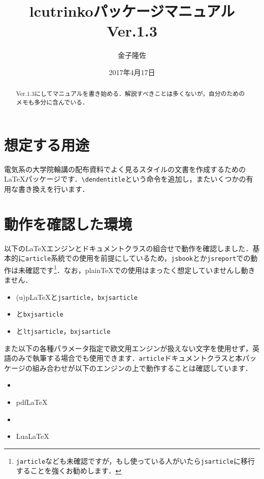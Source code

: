 \documentclass[uplatex,a4paper]{jsarticle}
\begin{document}
\title{lcutrinkoパッケージマニュアル Ver.1.3}
\date{2017年4月17日}
\author{金子隆佐}

\maketitle

\begin{abstract}
  Ver.1.3にしてマニュアルを書き始める．解説すべきことは多くないが，自分のためのメモも多分に含んでいる．
\end{abstract}

\section{想定する用途}

電気系の大学院輪講の配布資料でよく見るスタイルの文書を作成するための{\LaTeX}パッケージです．\verb|\dendentitle|という命令を追加し，またいくつかの有用な書き換えを行います．

\section{動作を確認した環境}

以下の{\LaTeX}エンジンとドキュメントクラスの組合せで動作を確認しました．基本的に\texttt{article}系統での使用を前提にしているため，\texttt{jsbook}とか\texttt{jsreport}での動作は未確認です\footnote{\texttt{jarticle}なども未確認ですが，もし使っている人がいたら\texttt{jsarticle}に移行することを強くお勧めします．}．なお，plain{\TeX}での使用はまったく想定していませんし動きません．
\begin{itemize}
\item (u){p\LaTeX}と\texttt{jsarticle}，\texttt{bxjsarticle}
\item {\XeLaTeX}と\texttt{bxjsarticle}
\item {\LuaLaTeX}と\texttt{ltjsarticle}，\texttt{bxjsarticle}
\end{itemize}

また以下の各種パラメータ指定で欧文用エンジンが扱えない文字を使用せず，英語のみで執筆する場合でも使用できます．\texttt{article}ドキュメントクラスと本パッケージの組み合わせが以下のエンジンの上で動作することは確認しています．
\begin{itemize}
\item {\LaTeXe}
\item {pdf\LaTeX}
\item {\XeLaTeX}
\item {LuaLaTeX}
\end{itemize}
\end{document}
